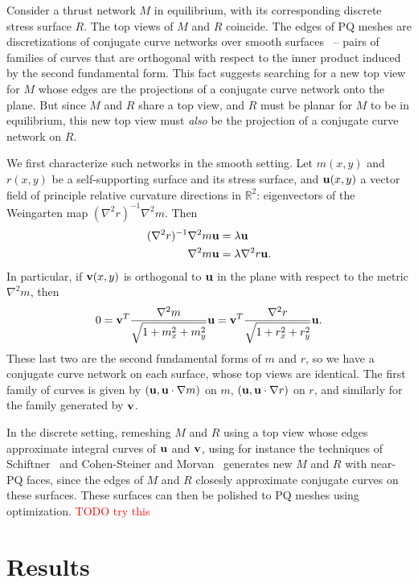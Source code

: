 \documentclass[annual]{acmsiggraph}
\newcommand{\todo}[1]{\textcolor{red}{#1}}
\begin{document}
Consider a thrust network $M$ in equilibrium, with its corresponding discrete stress surface $R$. The top views of $M$ and $R$ coincide. The edges of PQ meshes are discretizations of conjugate curve networks over smooth surfaces~\cite{Liu2006} -- pairs of families of curves that are orthogonal with respect to the inner product induced by the second fundamental form. This fact suggests searching for a new top view for $M$ whose edges are the projections of a conjugate curve network onto the plane. But since $M$ and $R$ share a top view, and $R$ must be planar for $M$ to be in equilibrium, this new top view must \emph{also} be the projection of a conjugate curve network on $R$.

We first characterize such networks in the smooth setting. Let $m(x,y)$ and $r(x,y)$ be a self-supporting surface and its stress surface, and ${\mathbf u}(x,y)$ a vector field of principle relative curvature directions in $\mathbb{R}^2$: eigenvectors of the Weingarten map $(\nabla^2 r)^{-1}\nabla^2 m$. Then
\begin{align*}
(\nabla^2 r)^{-1}\nabla^2 m {\mathbf u} &= \lambda {\mathbf u}\\
\nabla^2 m {\mathbf u} &= \lambda \nabla^2 r {\mathbf u}.
\end{align*}
In particular, if ${\mathbf v}(x,y)$ is orthogonal to ${\mathbf u}$ in the plane with respect to the metric $\nabla^2 m$, then
\begin{equation*}
0 = {\mathbf v}^T \frac{\nabla^2 m}{\sqrt{1+m_x^2+m_y^2}} {\mathbf u} = {\mathbf v}^T \frac{\nabla^2 r}{\sqrt{1+r_x^2+r_y^2}} {\mathbf u}.
\end{equation*}
These last two are the second fundamental forms of $m$ and $r$, so we have a conjugate curve network on each surface, whose top views are identical. The first family of curves is given by $({\mathbf u}, {\mathbf u}\cdot \nabla m)$ on $m$, $({\mathbf u}, {\mathbf u}\cdot \nabla r)$ on $r$, and similarly for the family generated by ${\mathbf v}$.

In the discrete setting, remeshing $M$ and $R$ using a top view whose edges approximate integral curves of ${\mathbf u}$ and ${\mathbf v}$, using for instance the techniques of Schiftner~ and Cohen-Steiner and Morvan~ generates new $M$ and $R$ with near-PQ faces, since the edges of $M$ and $R$ closesly approximate conjugate curves on these surfaces. These surfaces can then be polished to PQ meshes using optimization.
\todo{TODO try this}

\section{Results} \label{sec:results}
\end{document}
